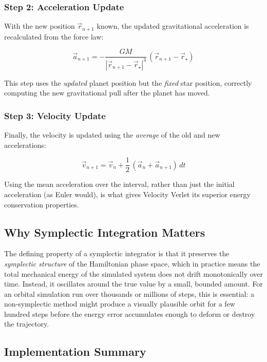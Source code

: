 \subsubsection{Step 2: Acceleration Update}

With the new position $\vec{r}_{n+1}$ known, the updated gravitational acceleration is recalculated from the force law:

\begin{equation}
\vec{a}_{n+1} = -\frac{GM}{|\vec{r}_{n+1} - \vec{r}_\star|^3}\,(\vec{r}_{n+1} - \vec{r}_\star)
\end{equation}

This step uses the \emph{updated} planet position but the \emph{fixed} star position, correctly computing the new gravitational pull after the planet has moved.

\subsubsection{Step 3: Velocity Update}

Finally, the velocity is updated using the \emph{average} of the old and new accelerations:

\begin{equation}
\vec{v}_{n+1} = \vec{v}_n + \frac{1}{2}\,(\vec{a}_n + \vec{a}_{n+1})\,dt
\end{equation}

Using the mean acceleration over the interval, rather than just the initial acceleration (as Euler would), is what gives Velocity Verlet its superior energy conservation properties.

\subsection{Why Symplectic Integration Matters}

The defining property of a symplectic integrator is that it preserves the \emph{symplectic structure} of the Hamiltonian phase space, which in practice means the total mechanical energy of the simulated system does not drift monotonically over time. Instead, it oscillates around the true value by a small, bounded amount. For an orbital simulation run over thousands or millions of steps, this is essential: a non-symplectic method might produce a visually plausible orbit for a few hundred steps before the energy error accumulates enough to deform or destroy the trajectory.

\subsection{Implementation Summary}

